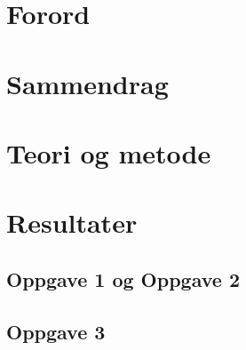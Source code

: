 \documentclass{article}
\begin{document}

\newpage


\section{Forord} %
\label{sec:forord}

\newpage



\section{Sammendrag} %
\label{sec:sammendrag}

\newpage


\label{sec:innholdsfortegnelse_og_figur_og_tabelliste}
\renewcommand{\contentsname}{Innholdsfortegnelse og figur- og tabelliste}
\tableofcontents
\newpage



\section{Teori og metode} %
\label{sec:teori}

\clearpage

\newpage




\section{Resultater} %
\label{sec:resultater}


\subsection{Oppgave 1 og Oppgave 2} %
\label{sub:oppgave_1}

\newpage


\subsection{Oppgave 3} %
\label{sub:oppgave_3}

\newpage
\end{document}
